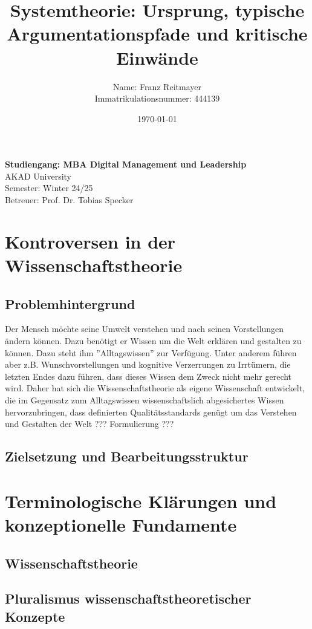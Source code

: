 \documentclass[a4paper,12pt]{article}
\title{Systemtheorie: Ursprung, typische Argumentationspfade und kritische Einwände}
\author{Name: Franz Reitmayer \\ Immatrikulationsnummer: 444139}
\date{\today}
\begin{document}
\maketitle
\vfill
\begin{center}
\textbf{Studiengang: MBA Digital Management und Leadership} \\
AKAD University \\
Semester: Winter 24/25 \\
Betreuer: Prof. Dr. Tobias Specker
\end{center}
\vfill
\newpage
\tableofcontents
\newpage


\section{Kontroversen in der Wissenschaftstheorie}
\subsection{Problemhintergrund}
Der Mensch möchte seine Umwelt verstehen und nach seinen Vorstellungen ändern können. Dazu benötigt er Wissen um die Welt erklären und gestalten zu können. Dazu steht ihm ''Alltagswissen'' zur Verfügung. Unter anderem führen aber z.B. Wunschvorstellungen und kognitive Verzerrungen zu Irrtümern, die letzten Endes dazu führen, dass dieses Wissen dem Zweck nicht mehr gerecht wird. Daher hat sich die Wissenschaftstheorie als eigene Wissenschaft entwickelt, die im Gegensatz zum Alltagswissen wissenschaftslich abgesichertes Wissen hervorzubringen, dass definierten Qualitätsstandards genügt um das Verstehen und Gestalten der Welt  ??? Formulierung ???
\subsection{Zielsetzung und Bearbeitungsstruktur}



\section{Terminologische Klärungen und konzeptionelle Fundamente}
\subsection{Wissenschaftstheorie}
\subsection{Pluralismus wissenschaftstheoretischer Konzepte}
\end{document}

